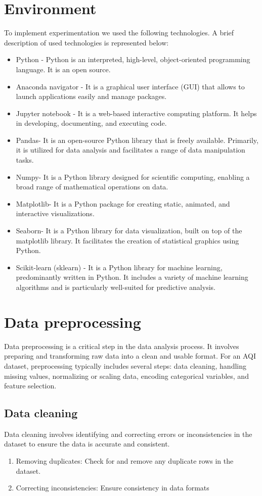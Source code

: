 \documentclass{book}
\numberwithin{equation}{section}
\numberwithin{figure}{section}
\begin{document}
\section{Environment}
\label{environment}
To implement experimentation we used the following technologies. A brief description
of used technologies is represented below:
\begin{itemize}
\item Python - Python is an interpreted, high-level, object-oriented programming language. It is an open source.
\item Anaconda navigator - It is a graphical user interface (GUI) that allows to launch applications easily and manage packages.
\item Jupyter notebook - It is a web-based interactive computing platform. It helps in developing, documenting, and executing code.
\item Pandas- It is an open-source Python library that is freely available. Primarily, it is utilized for data analysis and facilitates a range of data manipulation tasks.
\item Numpy- It is a Python library designed for scientific computing, enabling a broad range of mathematical operations on data.
\item Matplotlib- It is a Python package for creating static, animated, and interactive visualizations.
\item Seaborn- It is a Python library for data visualization, built on top of the matplotlib library. It facilitates the creation of statistical graphics using Python.
\item Scikit-learn (sklearn) - It is a Python library for machine learning, predominantly written in Python. It includes a variety of machine learning algorithms and is particularly well-suited for predictive analysis.
\end{itemize}
\section{Data preprocessing}
\label{preprocessing}
Data preprocessing is a critical step in the data analysis process. It involves preparing and transforming raw data into a clean and usable format. For an AQI dataset, preprocessing typically includes several steps: data cleaning, handling missing values, normalizing or scaling data, encoding categorical variables, and feature selection.
\subsection{Data cleaning}
\label{cleaning}
Data cleaning involves identifying and correcting errors or inconsistencies in the dataset to ensure the data is accurate and consistent.
\begin{enumerate}
\item Removing duplicates: Check for and remove any duplicate rows in the dataset.
\item Correcting inconsistencies: Ensure consistency in data formats
\end{enumerate}
\end{document}
